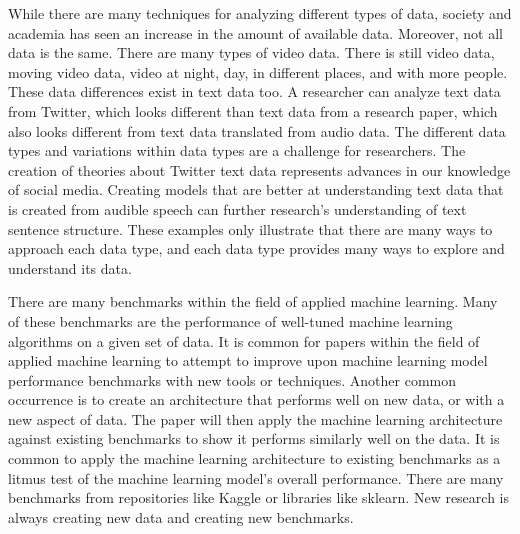 While there are many techniques for analyzing different types of data, society and academia has seen an increase in the amount of available data.  Moreover, not all data is the same.  There are many types of video data.  There is still video data, moving video data, video at night, day, in different places, and with more people.  These data differences exist in text data too.  A researcher can analyze text data from Twitter, which looks different than text data from a research paper, which also looks different from text data translated from audio data.  The different data types and variations within data types are a challenge for researchers.  The creation of theories about Twitter text data represents advances in our knowledge of social media.  Creating models that are better at understanding text data that is created from audible speech can further research's understanding of text sentence structure.  These examples only illustrate that there are many ways to approach each data type, and each data type provides many ways to explore and understand its data.

There are many benchmarks within the field of applied machine learning.  Many of these benchmarks are the performance of well-tuned machine learning algorithms on a given set of data.  It is common for papers within the field of applied machine learning to attempt to improve upon machine learning model performance benchmarks with new tools or techniques.  Another common occurrence is to create an architecture that performs well on new data, or with a new aspect of data.  The paper will then apply the machine learning architecture against existing benchmarks to show it performs similarly well on the data.  It is common to apply the machine learning architecture to existing benchmarks as a litmus test of the machine learning model's overall performance.  There are many benchmarks from repositories like Kaggle or libraries like sklearn.  New research is always creating new data and creating new benchmarks.

